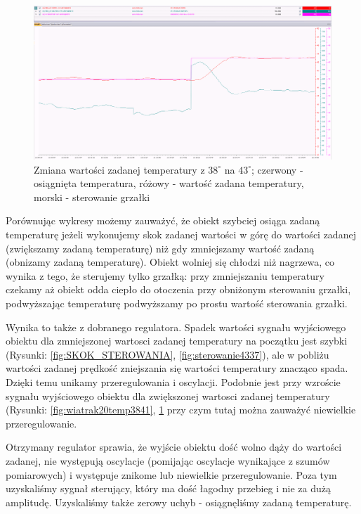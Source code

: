 \documentclass[12pt, a4paper]{article}
\begin{document}
\begin{figure}[H]
	\centering
	\includegraphics[width=0.9\linewidth]{sterowanie3843}
	\caption{Zmiana wartości zadanej temperatury z  $38^\circ$ na $43^\circ$; czerwony - osiągnięta temperatura, różowy - wartość zadana temperatury, morski - sterowanie  grzałki}
	\label{fig:sterowanie3843}
\end{figure}

Porównując wykresy możemy zauważyć, że obiekt szybciej osiąga zadaną temperaturę jeżeli wykonujemy skok zadanej wartości w górę do wartości zadanej (zwiększamy zadaną temperaturę) niż gdy zmniejszamy wartość zadaną (obnizamy zadaną temperaturę). Obiekt wolniej się chłodzi niż nagrzewa, co wynika z tego, że sterujemy tylko grzałką: przy zmniejszaniu temperatury czekamy aż obiekt odda ciepło do otoczenia przy obniżonym sterowaniu grzałki, podwyższając temperaturę podwyższamy po prostu wartość sterowania grzałki.  

Wynika to także z dobranego regulatora. Spadek wartości sygnału wyjściowego obiektu dla zmniejszonej wartosci zadanej temperatury na początku jest szybki (Rysunki: \ref{fig:SKOK_STEROWANIA}, \ref{fig:sterowanie4337}), ale w pobliżu wartości zadanej prędkość zniejszania się wartości temperatury znacząco spada. Dzięki temu unikamy przeregulowania i oscylacji. Podobnie jest przy wzroście sygnału wyjściowego obiektu dla zwiększonej wartosci zadanej temperatury  (Rysunki: \ref{fig:wiatrak20temp3841}, \ref{fig:sterowanie3843} przy czym tutaj można zauważyć niewielkie przeregulowanie. 

Otrzymany regulator sprawia, że wyjście obiektu dość wolno dąży do wartości zadanej, nie występują oscylacje (pomijając oscylacje wynikające z szumów pomiarowych) i występuje znikome lub niewielkie przeregulowanie. Poza tym uzyskaliśmy sygnał sterujący, który ma dość łagodny przebieg i nie za dużą amplitudę. Uzyskaliśmy także zerowy uchyb - osiągnęliśmy zadaną temperaturę. 
\end{document}
